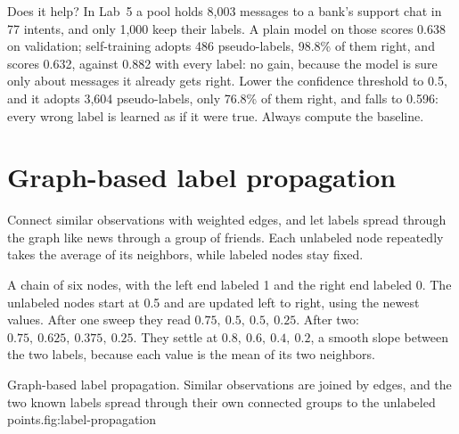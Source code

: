 \begin{workedexample}
Does it help? In Lab~5 a pool holds 8,003 messages to a bank's support chat in 77 intents, and only 1,000 keep their labels. A plain model on those scores 0.638 on validation; self-training adopts 486 pseudo-labels, 98.8\% of them right, and scores 0.632, against 0.882 with every label: no gain, because the model is sure only about messages it already gets right. Lower the confidence threshold to 0.5, and it adopts 3,604 pseudo-labels, only 76.8\% of them right, and falls to 0.596: every wrong label is learned as if it were true. Always compute the baseline.
\end{workedexample}

\section{Graph-based label propagation}

Connect similar observations with weighted edges, and let labels spread through the graph like news through a group of friends. Each unlabeled node repeatedly takes the average of its neighbors, while labeled nodes stay fixed.

\begin{workedexample}
A chain of six nodes, with the left end labeled 1 and the right end labeled 0. The unlabeled nodes start at 0.5 and are updated left to right, using the newest values. After one sweep they read $0.75,\ 0.5,\ 0.5,\ 0.25$. After two: $0.75,\ 0.625,\ 0.375,\ 0.25$. They settle at $0.8,\ 0.6,\ 0.4,\ 0.2$, a smooth slope between the two labels, because each value is the mean of its two neighbors.
\end{workedexample}

\begin{utpfig}{Graph-based label propagation. Similar observations are joined by edges, and the two known labels spread through their own connected groups to the unlabeled points.}{fig:label-propagation}
\end{utpfig}

